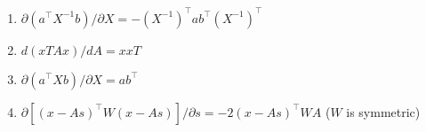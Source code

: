 \begin{enumerate}
    \item  $\partial (a^\top X^{-1}b)/\partial X = -(X^{-1})^\top ab^\top (X^{-1})^\top$

    \item  $d(xTAx)/dA = xxT$

    \item  $\partial (a^\top Xb)/\partial X = ab^\top$

    \item  $\partial [(x - As)^\top W(x - As)]/\partial s = -2(x - As)^\top WA$  ($W$ is symmetric)



\end{enumerate}



















